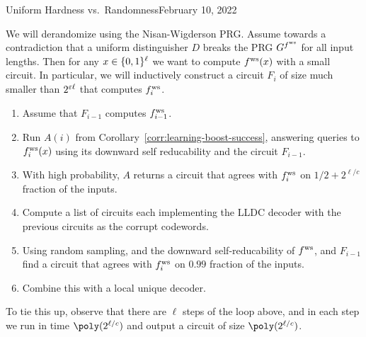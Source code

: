 \begin{lecture}{4}{Uniform Hardness vs.\ Randomness}{February 10, 2022}
\begin{proofsk}
  We will derandomize using the Nisan-Wigderson PRG. Assume towards a
  contradiction that a uniform distinguisher $D$ breaks the PRG $G^{ f^{\text{ws}} }$
  for all input lengths. Then for any $x \in \{0, 1\}^{\ell}$ we want to
  compute $ f^{\text{ws}} (x)$ with a small circuit. In particular, we will inductively
  construct a circuit $F_i$ of size much smaller than $2^{\varepsilon \ell}$ that
  computes $ f^{\text{ws}} _i$.
  \begin{enumerate}
    \item Assume that $F_{i - 1}$ computes $ f^{\text{ws}} _{i - 1}$.
    \item Run $A(i)$ from Corollary~\ref{corr:learning-boost-success},
      answering queries to $ f^{\text{ws}} _i(x)$ using its downward self reducability
      and the circuit $F_{i - 1}$.
    \item With high probability, $A$ returns a circuit that agrees with
      $ f^{\text{ws}} _i$ on $1/2 + 2^{\ell / c}$ fraction of the inputs.
    \item Compute a list of circuits each implementing the LLDC decoder with
      the previous circuits as the corrupt codewords.
    \item Using random sampling, and the downward self-reducability of
      $ f^{\text{ws}} $, and $F_{i - 1}$ find a circuit that agrees with $ f^{\text{ws}} _i$ on
      $0.99$ fraction of the inputs.
    \item Combine this with a local unique decoder.
  \end{enumerate}
  To tie this up, observe that there are $\ell$ steps of the loop above,
  and in each step we run in time $\poly(2^{\ell / c})$ and output a circuit
  of size $\poly(2^{\ell / c})$.
\end{proofsk}

\end{lecture}
